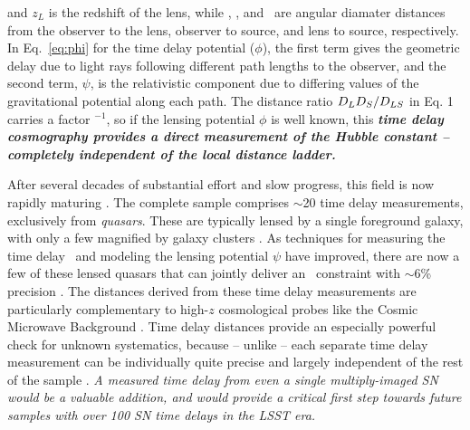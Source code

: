 \noindent and $z_L$ is the redshift of the lens, while \Dl, \Ds, 
and \Dls\ are angular diamater distances from the observer to the
lens, observer to source, and lens to source, respectively.  In
Eq.~\ref{eq:phi} for the time delay potential ($\phi$), the first term
gives the geometric delay due to light rays following different path
lengths to the observer, and the second term, $\psi$, is the
relativistic component due to differing values of the gravitational
potential along each path. The distance ratio $D_LD_S/D_{LS}$ in Eq. 1
carries a factor \Ho$^{-1}$, so if the lensing potential $\phi$ is
well known, this {\bf \em time delay cosmography provides a direct measurement of
the Hubble constant -- completely independent of the local distance
ladder.}

After several decades of substantial effort and slow progress, this
field is now rapidly maturing \citep[see][for recent
reviews]{Jackson:2007,Treu:2010}.  The complete sample comprises
$\sim$20 time delay measurements, exclusively from {\em quasars}.
These are typically lensed by a single foreground galaxy, with only a
few magnified by galaxy clusters
\citep{Inada:2003,Inada:2006,Oguri:2008,Dahle:2013}.
As techniques for measuring the time delay \dt\ and modeling the
lensing potential $\psi$ have improved, there are now a few of these
lensed quasars that can jointly deliver an \Ho\ constraint with
$\sim$6\% precision \citep[e.g.][]{Suyu:2010,Suyu:2013}. The distances
derived from these time delay measurements are particularly
complementary to high-$z$ cosmological probes like the Cosmic
Microwave Background \citep[CMB; ][]{Linder:2011}.  Time delay distances
provide an especially powerful check for unknown systematics, because
-- unlike \SNIa -- each separate time delay measurement can be
individually quite precise and largely independent of the rest of the
sample \citep{Suyu:2013,Treu:2013}.  
{\em A measured time delay from even a single multiply-imaged SN would
be a valuable addition, and would provide a critical first step
towards future samples with over 100 SN time delays in the LSST era.}

\bigskip

